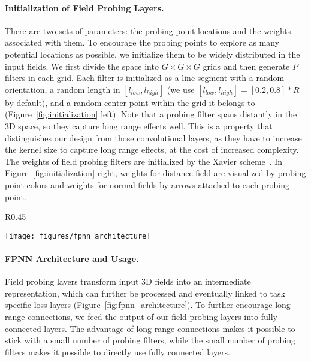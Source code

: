 \documentclass{article}
\begin{document}
\paragraph{Initialization of Field Probing Layers.}

There are two sets of parameters: the probing point locations and the weights associated with them. To encourage the probing points to explore as many potential locations as possible, we initialize them to be widely distributed in the input fields. We first divide the space into $G \times G \times G$ grids and then generate $P$ filters in each grid. Each filter is initialized as a line segment with a random orientation, a random length in $[l_{low}, l_{high}]$ (we use $[l_{low}, l_{high}]=[0.2, 0.8]*R$ by default), and a random center point within the grid it belongs to (Figure~\ref{fig:initialization} left). Note that a probing filter spans distantly in the 3D space, so they capture long range effects well. This is a property that distinguishes our design from those convolutional layers, as they have to increase the kernel size to capture long range effects, at the cost of increased complexity. The weights of field probing filters are initialized by the Xavier scheme~\cite{glorot2010understanding}. In Figure~\ref{fig:initialization} right, weights for distance field are visualized by probing point colors and weights for normal fields by arrows attached to each probing point.


\begin{wrapfigure}{R}{0.45\linewidth}
	\vspace{-1.4cm}
	\begin{center}
		\texttt{[image: figures/fpnn\_architecture]}
	\end{center}
	\vspace{-0.4cm}
	\caption{FPNN architecture. Field probing layers can be used together with other inference layers to minimize task specific losses.}
	\label{fig:fpnn_architecture}
	\vspace{-0.5cm}
\end{wrapfigure}

\paragraph{FPNN Architecture and Usage.} Field probing layers transform input 3D fields into an intermediate representation, which can further be processed and eventually linked to task specific loss layers (Figure~\ref{fig:fpnn_architecture}). To further encourage long range connections, we feed the output of our field probing layers into fully connected layers. The advantage of long range connections makes it possible to stick with a small number of probing filters, while the small number of probing filters makes it possible to directly use fully connected layers.
\end{document}
